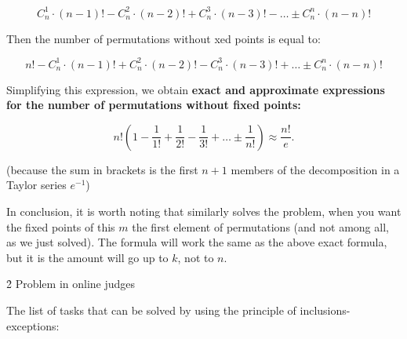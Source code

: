$$ C_n^1 \cdot (n-1)! - C_n^2 \cdot (n-2)! + C_n^3 \cdot (n-3)! - \ldots \pm C_n^n \cdot (n-n)! $$

Then the number of permutations without xed points is equal to:

$$ n! - C_n^1 \cdot (n-1)! + C_n^2 \cdot (n-2)! - C_n^3 \cdot (n-3)! + \ldots \pm C_n^n \cdot (n-n)! $$

Simplifying this expression, we obtain \bf{exact and approximate expressions for the number of permutations without fixed points}:

$$ n! \left( 1 - \frac{1}{1!} + \frac{1}{2!} - \frac{1}{3!} + \ldots \pm \frac{1}{n!} \right) \approx \frac{n!}{e}. $$

(because the sum in brackets is the first $n+1$ members of the decomposition in a Taylor series $e^{-1}$)

In conclusion, it is worth noting that similarly solves the problem, when you want the fixed points of this $m$ the first element of permutations (and not among all, as we just solved). The formula will work the same as the above exact formula, but it is the amount will go up to $k$, not to $n$.



\h2{ Problem in online judges }

The list of tasks that can be solved by using the principle of inclusions-exceptions:

